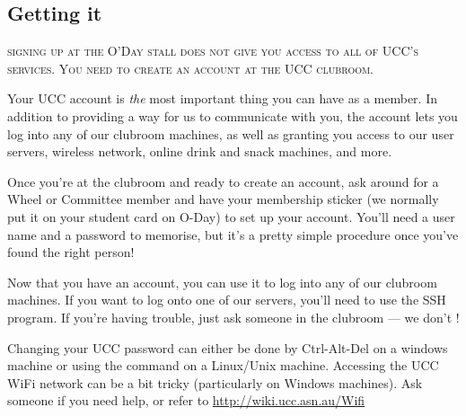 \label{SetupAccount}


\begin{mdframed}

\section{Getting it}

\textsc{signing up at the O'Day stall does not give you access to all of UCC's services. You need to create an account at the UCC clubroom.}

Your UCC account is \emph{the} most important thing you can have as a member. In addition to providing a way for us to communicate with you, the account lets you log into any of our clubroom machines, as well as granting you access to our user servers, wireless network, online drink and snack machines, and more.

Once you're at the clubroom and ready to create an account, ask around for a Wheel or Committee member and have your membership sticker (we normally put it on your student card on O-Day) to set up your account. You'll need a user name and a password to memorise, but it's a pretty simple procedure once you've found the right person!


Now that you have an account, you can use it to log into any of our clubroom machines. If you want to log onto one of our servers, you'll need to use the SSH program. If you're having trouble, just ask someone in the clubroom --- we don't !

Changing your UCC password can either be done by Ctrl-Alt-Del on a windows machine or using the command  on a Linux/Unix machine.
Accessing the UCC WiFi network can be a bit tricky (particularly on Windows machines). Ask someone if you need help, or refer to \url{http://wiki.ucc.asn.au/Wifi}

\end{mdframed}

\pagebreak

